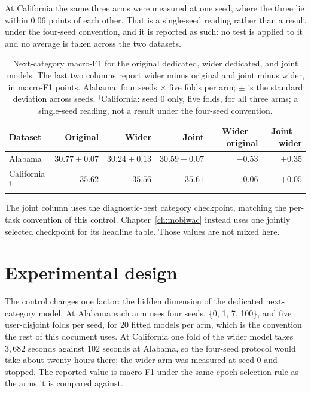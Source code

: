 At California the same three arms were measured at one seed, where the three lie within $0.06$
points of each other. That is a single-seed reading rather than a result under the four-seed
convention, and it is reported as such: no test is applied to it and no average is taken across the
two datasets.

\begin{table}[H]
    \centering
    \caption{Next-category macro-F1 for the original dedicated, wider dedicated,
    and joint models. The last two columns report wider minus original and joint
    minus wider, in macro-F1 points. Alabama: four seeds $\times$ five folds per arm;
    $\pm$ is the standard deviation across seeds. $^{\dagger}$California: seed 0 only,
    five folds, for all three arms; a single-seed reading, not a result under the
    four-seed convention.}
    \label{tab:apx-parameter-comparison}
    {\small
    \setlength{\tabcolsep}{4pt}
    \begin{tabular}{lrrrrr}
        \toprule
        Dataset & Original & Wider & Joint & Wider $-$ original & Joint $-$ wider \\
        \midrule
        Alabama                  & $30.77 \pm 0.07$ & $30.24 \pm 0.13$ & $30.59 \pm 0.07$ & $-0.53$ & $+0.35$ \\
        California$^{\dagger}$   & $35.62$           & $35.56$           & $35.61$           & $-0.06$ & $+0.05$ \\
        \bottomrule
    \end{tabular}
    }
\end{table}

The joint column uses the diagnostic-best category checkpoint, matching the
per-task convention of this control. Chapter~\ref{ch:mobiwac} instead uses one
jointly selected checkpoint for its headline table. Those values are not mixed here.

\section{Experimental design}
\label{sec:apx-parameter-design}

The control changes one factor: the hidden dimension of the dedicated
next-category model. At Alabama each arm uses four seeds, \{0, 1, 7, 100\}, and five
user-disjoint folds per seed, for 20 fitted models per arm, which is the convention the rest of
this document uses. At California one fold of the wider model takes $3{,}682$ seconds against
$102$ seconds at Alabama, so the four-seed protocol would take about twenty hours there; the
wider arm was measured at seed 0 and stopped. The reported value is macro-F1 under the same
epoch-selection rule as the arms it is compared against.

